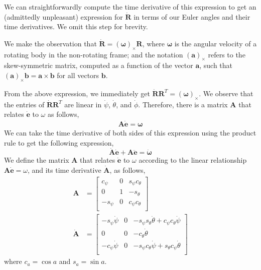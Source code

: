We can straightforwardly compute the time derivative of this expression to get an (admittedly unpleasant) expression for $\dot{\mathbf{R}}$ in terms of our Euler angles and their time derivatives.
We omit this step for brevity.

We make the observation that $\dot{\mathbf{R}} = (\mathbf{\omega})_{\times} \mathbf{R}$, where $\mathbf{\omega}$ is the angular velocity of a rotating body in the non-rotating frame; and the notation $\left( \mathbf{a} \right)_{\times}$ refers to the skew-symmetric matrix, computed as a function of the vector $\mathbf{a}$, such that $\left(\mathbf{a}\right)_{\times}\mathbf{b} = \mathbf{a}\times\mathbf{b}$ for all vectors $\mathbf{b}$. 

From the above expression, we immediately get $\dot{\mathbf{R}} \mathbf{R}^{T} = (\mathbf{\omega})_{\times}$.
We observe that the entries of $\dot{\mathbf{R}} \mathbf{R}^{T}$ are linear in  $\dot\psi$, $\dot\theta$, and $\dot\phi$.
Therefore, there is a matrix $\mathbf{A}$ that relates $\dot{\mathbf{e}}$ to $\omega$ as follows,
%
\footnotesize
\begin{equation}
\begin{aligned}
%
\mathbf{A} \dot{\mathbf{e}} = \mathbf{\omega}
%
\end{aligned}
\end{equation}
\normalsize
%
We can take the time derivative of both sides of this expression using the product rule to get the following expression,
%
\begin{equation}
\dot{\mathbf{A}} \dot{\mathbf{e}} + \mathbf{A} \ddot{\mathbf{e}} = \dot{\mathbf{\omega}}
\end{equation}
%
We define the matrix $\mathbf{A}$ that relates $\dot{\mathbf{e}}$ to $\omega$ according to the linear relationship $\mathbf{A} \dot{\mathbf{e}} = \omega$, and its time derivative $\dot{\mathbf{A}}$, as follows,
%
\footnotesize
\begin{equation}
\begin{aligned}
%
\mathbf{A} & =
\begin{bmatrix}
c_\psi  & 0 & s_\psi c_\theta \\
0       & 1 & -s_\theta       \\
-s_\psi & 0 & c_\psi c_\theta \\
\end{bmatrix} \\
%
\dot{\mathbf{A}} & =
\begin{bmatrix}
-s_\psi \dot{\psi} & 0 & -s_\psi s_\theta \dot{\theta} + c_\psi c_\theta \dot{\psi} \\
0                  & 0 & -c_\theta \dot{\theta} \\
-c_\psi \dot{\psi} & 0 & -s_\psi c_\theta \dot{\psi} + s_\theta c_\psi \dot{\theta} \\
\end{bmatrix}
%
\end{aligned}
\end{equation}
\normalsize
%
where $c_a=\cos a$ and $s_a=\sin a$.


